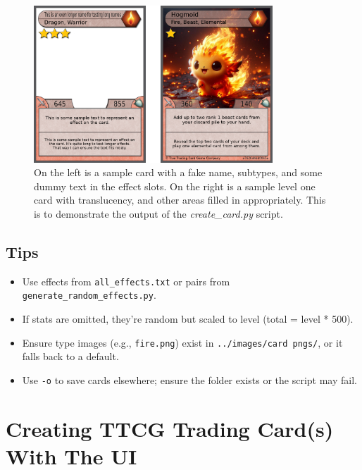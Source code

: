 \begin{figure}[h]
	\centering
	\includegraphics[width=0.8\textwidth]{images/sample_generated_output.png} 
	\caption{On the left is a sample card with a fake name, subtypes, and some dummy text in the effect slots. On the right is a sample level one card with translucency, and other areas filled in appropriately. This is to demonstrate the output of the \textit{create\_card.py} script.}
	\label{fig:sample_generated_output}
\end{figure}

\subsection{Tips}
\begin{itemize}
	\item Use effects from \texttt{all\_effects.txt} or pairs from \texttt{generate\_random\_effects.py}.
	\item If stats are omitted, they’re random but scaled to level (total = level * 500).
	\item Ensure type images (e.g., \texttt{fire.png}) exist in \texttt{../images/card pngs/}, or it falls back to a default.
	\item Use \texttt{-o} to save cards elsewhere; ensure the folder exists or the script may fail.
\end{itemize}



















\section{Creating TTCG Trading Card(s) With The UI}

